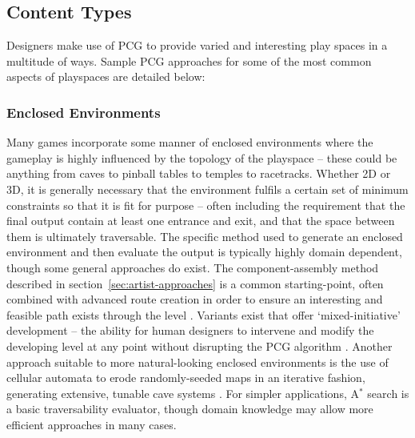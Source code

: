 \documentclass{acm_proc_article-sp}
\begin{document}
\subsection{Content Types}
Designers make use of PCG to provide varied and interesting play spaces in a multitude of ways. Sample PCG approaches for some of the most common aspects of playspaces are detailed below:

\subsubsection{Enclosed Environments}
Many games incorporate some manner of enclosed environments where the gameplay is highly influenced by the topology of the playspace -- these could be anything from caves to pinball tables to temples to racetracks. Whether 2D or 3D, it is generally necessary that the environment fulfils a certain set of minimum constraints so that it is fit for purpose -- often including the requirement that the final output contain at least one entrance and exit, and that the space between them is ultimately traversable. The specific method used to generate an enclosed environment and then evaluate the output is typically highly domain dependent, though some general approaches do exist. The component-assembly method described in section~\ref{sec:artist-approaches} is a common starting-point, often combined with advanced route creation in order to ensure an interesting and feasible path exists through the level \cite{smith2011launchpad}. Variants exist that offer `mixed-initiative' development -- the ability for human designers to intervene and modify the developing level at any point without disrupting the PCG algorithm \cite{mawhorter2010procedural}. Another approach suitable to more natural-looking enclosed environments is the use of cellular automata to erode randomly-seeded maps in an iterative fashion, generating extensive, tunable cave systems \cite{johnson2010cellular}. For simpler applications, A$^*$ search is a basic traversability evaluator, though domain knowledge may allow more efficient approaches in many cases.
\end{document}
